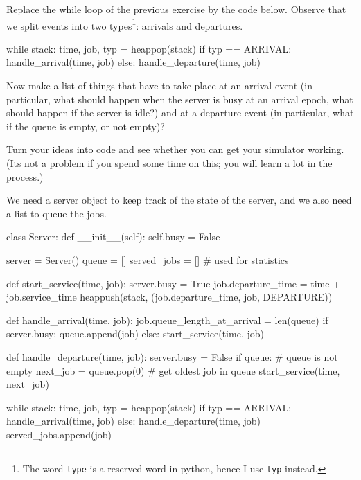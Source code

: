 \documentclass{scrartcl}
\begin{document}
\begin{exercise}
  Replace the while loop of the previous exercise by the code below. Observe that we split events into two types\footnote{The word \texttt{type} is a reserved word in python, hence I use \texttt{typ} instead.}: arrivals and departures. 

  \begin{pyblock}
while stack:
    time, job, typ = heappop(stack)
    if typ == ARRIVAL:
        handle_arrival(time, job)
    else:
        handle_departure(time, job)
    
  \end{pyblock}

Now make a list of things that have to take place at an arrival event (in particular, what should happen when the server is busy at an arrival epoch, what should happen if the server is idle?) and at a departure event (in particular, what if the queue is empty, or not empty)? 

Turn your ideas into code and see whether you can get your simulator working. (Its not a problem if you spend some time on this; you will learn a lot in the process.)

\begin{solution}
We need a server object to keep track of the state of the server, and we also need  a list to queue the jobs. 

  \begin{pyblock}
class Server:
    def __init__(self):
        self.busy = False

server = Server()
queue = []
served_jobs = [] # used for statistics

def start_service(time, job):
    server.busy = True
    job.departure_time = time + job.service_time
    heappush(stack, (job.departure_time, job, DEPARTURE))

def handle_arrival(time, job):
    job.queue_length_at_arrival = len(queue)
    if server.busy:
        queue.append(job)
    else:
        start_service(time, job)
        
def handle_departure(time, job):
    server.busy = False
    if queue: # queue is not empty
        next_job = queue.pop(0) # get oldest job in queue
        start_service(time, next_job)
        
while stack:
    time, job, typ = heappop(stack)
    if typ == ARRIVAL:
        handle_arrival(time, job)
    else:
        handle_departure(time, job)
        served_jobs.append(job)

  \end{pyblock}
\end{solution}

\end{exercise}
\end{document}
